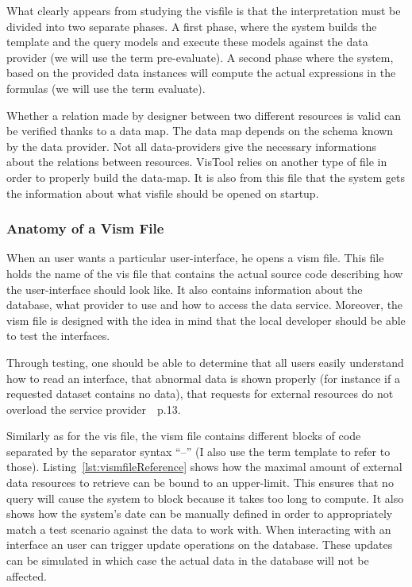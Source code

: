 What clearly appears from studying the visfile is that the interpretation must be divided into two separate phases. A first phase, where the system builds the template and the query models and execute these models against the data provider (we will use the term pre-evaluate). A second phase where the system, based on the provided data instances will compute the actual expressions in the formulas (we will use the term evaluate).

Whether a relation made by designer between two different resources is valid can be verified thanks to a data map. The data map depends on the schema known by the data provider. Not all data-providers give the necessary informations about the relations between resources. VisTool relies on another type of file in order to properly build the data-map. It is also from this file that the system gets the information about what visfile should be opened on startup.

\subsubsection{Anatomy of a Vism File}
When an user wants a particular user-interface, he opens a vism file. This file holds the name of the vis file that contains the actual source code describing how the user-interface should look like. It also contains information about the database, what provider to use and how to access the data service. Moreover, the vism file is designed with the idea in mind that the local developer should be able to test the interfaces.

Through testing, one should be able to determine that all users easily understand how to read an interface, that abnormal data is shown properly (for instance if a requested dataset contains no data), that requests for external resources do not overload the service provider~\cite{lauesen2013}~p.13. 



Similarly as for the vis file, the vism file contains different blocks of code separated by the separator syntax ``--'' (I also use the term template to refer to those). Listing~\ref{lst:vismfileReference} shows how the maximal amount of external data resources to retrieve can be bound to an upper-limit. This ensures that no query will cause the system to block because it takes too long to compute. It also shows how the system's date can be manually defined in order to appropriately match a test scenario against the data to work with. When interacting with an interface an user can trigger update operations on the database. These updates can be simulated in which case the actual data in the database will not be affected.

